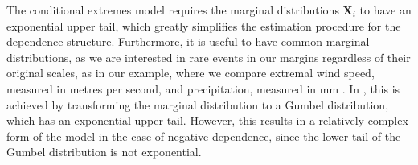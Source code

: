 \documentclass{article}
\numberwithin{equation}{section}
\begin{document}

The conditional extremes model requires the marginal distributions $\bm{X}_i$ to have an exponential upper tail, which greatly simplifies the estimation procedure for the dependence structure.
Furthermore, it is useful to have common marginal distributions, as we are interested in rare events in our margins regardless of their original scales, as in our example, where we compare extremal wind speed, measured in metres per second, and precipitation, measured in mm \citep{Winter2016}.
In \citet{Heffernan2004}, this is achieved by transforming the marginal distribution to a Gumbel distribution, which has an exponential upper tail.
However, this results in a relatively complex form of the model in the case of negative dependence, since the lower tail of the Gumbel distribution is not exponential.
\end{document}
